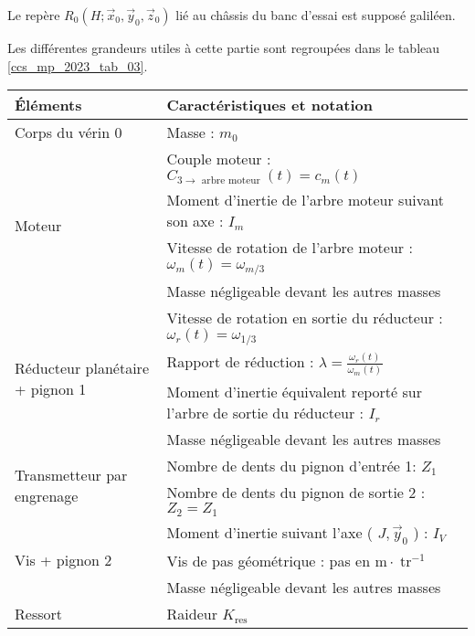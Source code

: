 Le repère $R_{0}\left(H ; \vec{x}_{0}, \vec{y}_{0}, \vec{z}_{0}\right)$ lié au châssis du banc d'essai est supposé galiléen.

Les différentes grandeurs utiles à cette partie sont regroupées dans le tableau \ref{ccs_mp_2023_tab_03}.

\begin{table}[!h]
\begin{center}
\begin{tabular}{lp{8cm}}
\hline
\textbf{Éléments} & \textbf{Caractéristiques et notation} \\
\hline
Corps du vérin 0 & Masse : $m_{0}$ \\
\hline
\multirow[t]{4}{*}{Moteur} & Couple moteur : $C_{3 \rightarrow \text { arbre moteur }}(t)=c_{m}(t)$ \\

 & Moment d'inertie de l'arbre moteur suivant son axe : $I_{m}$ \\

 & Vitesse de rotation de l'arbre moteur : $\omega_{m}(t)=\omega_{m / 3}$ \\

 & Masse négligeable devant les autres masses \\
\hline
\multirow[t]{4}{*}{Réducteur planétaire + pignon 1} & Vitesse de rotation en sortie du réducteur : $\omega_{r}(t)=\omega_{1 / 3}$ \\

 & Rapport de réduction : $\lambda=\frac{\omega_{r}(t)}{\omega_{m}(t)}$ \\

 & Moment d'inertie équivalent reporté sur l'arbre de sortie du réducteur : $I_{r}$ \\

 & Masse négligeable devant les autres masses \\
\hline
\multirow[t]{2}{*}{Transmetteur par engrenage} & Nombre de dents du pignon d'entrée 1: $Z_{1}$ \\

 & Nombre de dents du pignon de sortie 2 : $Z_{2}=Z_{1}$ \\
\hline
\multirow[t]{3}{*}{Vis + pignon 2} & Moment d'inertie suivant l'axe ( $J, \vec{y}_{0}$ ) : $I_{V}$ \\

 & Vis de pas géométrique : pas en $\mathrm{m} \cdot \operatorname{tr}^{-1}$ \\

 & Masse négligeable devant les autres masses \\
\hline
\multirow[t]{2}{*}{Ressort} & Raideur $K_{\text {res }}$ \\


\end{tabular}
\end{center}
\end{table}
